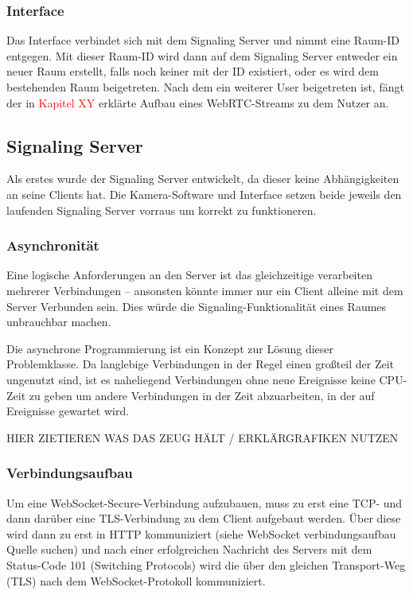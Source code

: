 \documentclass[journal]{IEEEtran}
\begin{document}
\begin{twocolumn}
\subsubsection{Interface}

Das Interface verbindet sich mit dem Signaling Server und nimmt eine Raum-ID
entgegen. Mit dieser Raum-ID wird dann auf dem Signaling Server entweder ein
neuer Raum erstellt, falls noch keiner mit der ID existiert, oder es wird dem
bestehenden Raum beigetreten. Nach dem ein weiterer User beigetreten ist, fängt
der in \textcolor{red}{Kapitel XY} erklärte Aufbau eines WebRTC-Streams zu dem
Nutzer an.

\subsection{Signaling Server}

Als erstes wurde der Signaling Server entwickelt, da dieser keine
Abhängigkeiten an seine Clients hat. Die Kamera-Software und Interface setzen
beide jeweils den laufenden Signaling Server vorraus um korrekt zu
funktioneren.

\subsubsection*{Asynchronität}

Eine logische Anforderungen an den Server ist das gleichzeitige verarbeiten
mehrerer Verbindungen – ansonsten könnte immer nur ein Client alleine mit dem
Server Verbunden sein. Dies würde die Signaling-Funktionalität eines Raumes
unbrauchbar machen.

Die asynchrone Programmierung ist ein Konzept zur Lösung dieser Problemklasse.
Da langlebige Verbindungen in der Regel einen großteil der Zeit ungenutzt sind,
ist es naheliegend Verbindungen ohne neue Ereignisse keine CPU-Zeit zu geben
um andere Verbindungen in der Zeit abzuarbeiten, in der auf Ereignisse gewartet
wird.

HIER ZIETIEREN WAS DAS ZEUG HÄLT / ERKLÄRGRAFIKEN NUTZEN

\subsubsection{Verbindungsaufbau}

Um eine WebSocket-Secure-Verbindung aufzubauen, muss zu erst eine TCP- und dann
darüber eine TLS-Verbindung zu dem Client aufgebaut werden. Über diese wird
dann zu erst in HTTP kommuniziert (siehe WebSocket verbindungsaufbau Quelle
suchen) und nach einer erfolgreichen Nachricht des Servers mit dem Status-Code
101 (Switching Protocols) wird die über den gleichen Transport-Weg (TLS)
nach dem WebSocket-Protokoll kommuniziert.


\end{twocolumn}
\end{document}
